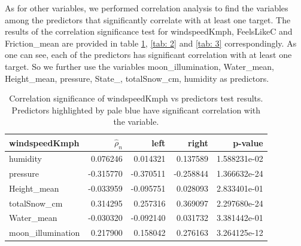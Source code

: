 \documentclass[12pt, bachelor, substylefile = algo_title.rtx]{disser}
\theoremstyle{definition}
\begin{document}
As for other variables, we performed correlation analysis to find the variables among the predictors that significantly correlate with at least one target. The results of the correlation significance test for windspeedKmph, FeelsLikeC and Friction\_mean are provided in table \ref{tab: 1}, \ref{tab: 2} and \ref{tab: 3} correspondingly. As one can see, each of the predictors has significant correlation with at least one target. So we further use the variables moon\_illumination, Water\_mean, Height\_mean, pressure, State\_, totalSnow\_cm, humidity as predictors.


\begin{table}[!h]
\centering
\begin{tabular}{|l|r|r|r|r|}
\hline
windspeedKmph &   $\widehat{\rho}_n$  &      left &     right &        p-value \\
\hline
\cellcolor{blue!25} humidity          & 0.076246 &  0.014321 &  0.137589 &  1.588231e-02 \\
\hline
\cellcolor{blue!25} pressure          & -0.315770 & -0.370511 & -0.258844 &  1.366632e-24 \\
\hline
Height\_mean       & -0.033959 & -0.095751 &  0.028093 &  2.833401e-01 \\
\hline
\cellcolor{blue!25} totalSnow\_cm      & 0.314295 &  0.257316 &  0.369097 &  2.297680e-24 \\
\hline
Water\_mean        &  -0.030320 & -0.092140 &  0.031732 &  3.381442e-01 \\
\hline
\cellcolor{blue!25} moon\_illumination &  0.217900 &  0.158042 &  0.276163 &  3.264125e-12  \\
\hline
\end{tabular}
\caption{Correlation significance of  windspeedKmph vs predictors test results. Predictors highlighted by pale blue have significant correlation with the variable.}
\label{tab: 1}
\end{table}
\end{document}

